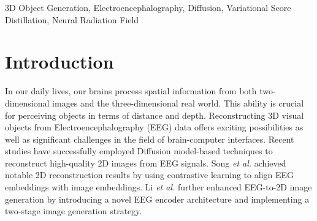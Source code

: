 \documentclass[conference]{IEEEtran}
\begin{document}
\maketitle

\begin{abstract}

Reconstructing 3D visual stimuli from Electroencephalography (EEG) data holds significant potential for applications in Brain-Computer Interfaces (BCIs) and aiding individuals with communication disorders. Traditionally, efforts have focused on converting brain activity into 2D images, neglecting the translation of EEG data into 3D objects. This limitation is noteworthy, as the human brain inherently processes three-dimensional spatial information regardless of whether observing 2D images or the real world. The neural activities captured by EEG contain rich spatial information that is inevitably lost when reconstructing only 2D images, thus limiting its practical applications in BCI. The transition from EEG data to 3D object reconstruction faces considerable obstacles. These include the presence of extensive noise within EEG signals and a scarcity of datasets that include both EEG and 3D information, which complicates the extraction process of 3D visual data. Addressing this challenging task, we propose an innovative EEG encoder architecture that integrates a dual self-attention mechanism. We use a hybrid training strategy to train the EEG Encoder, which includes cross-attention, contrastive learning, and self-supervised learning techniques. Additionally, by employing stable diffusion as a prior distribution and utilizing Variational Score Distillation to train a neural radiation field, we successfully generate 3D objects with similar content and structure from EEG data.
Our code is available at \href{https://github.com/gegen666/EEGTo3D}{https://github.com/gegen666/EEGTo3D}.
\end{abstract}

\begin{IEEEkeywords}
3D Object Generation, Electroencephalography, Diffusion, Variational Score Distillation, Neural Radiation Field
\end{IEEEkeywords}

\section{Introduction}
In our daily lives, our brains process spatial information from both two-dimensional images and the three-dimensional real world\cite{b1}. This ability is crucial for perceiving objects in terms of distance and depth\cite{b1}. Reconstructing 3D visual objects from Electroencephalography (EEG) data offers exciting possibilities as well as significant challenges in the field of brain-computer interfaces. Recent studies\cite{b2,b3} have successfully employed Diffusion\cite{b5} model-based techniques to reconstruct high-quality 2D images from EEG signals. Song \textit{et al.}\cite{b38} achieved notable 2D reconstruction results by using contrastive learning to align EEG embeddings with image embeddings. Li \textit{et al.}\cite{b29} further enhanced EEG-to-2D image generation by introducing a novel EEG encoder architecture and implementing a two-stage image generation strategy.
\end{document}
